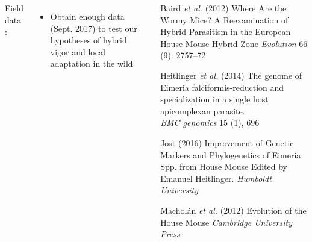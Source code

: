 \documentclass[30pt, a0paper, portrait, margin=0mm, innermargin=15mm,
               blockverticalspace=15mm, colspace=15mm, subcolspace=8mm]{tikzposter}
\begin{document}
\begin{columns}
{ %
 Field data :
    \begin{itemize}
        \item Obtain enough data (Sept. 2017) to test our hypotheses of hybrid vigor and local adaptation in the wild
  \end{itemize}

 
}


      {
        \begin{small}
          
          \hangindent=2cm Baird \textit{et al.} (2012) Where Are the Wormy Mice? A Reexamination of Hybrid Parasitism in the European House Mouse Hybrid Zone
           \textit{Evolution} 66 (9): 2757--72
           
          \hangindent=2cm Heitlinger \textit{et al.} (2014) The genome of Eimeria falciformis-reduction and specialization in a single host apicomplexan              parasite.\\ \textit{BMC genomics} 15 (1), 696

          \hangindent=2cm Jost (2016) Improvement of Genetic Markers and Phylogenetics of Eimeria Spp. from House Mouse
          Edited by Emanuel Heitlinger. \textit{Humboldt University}

          \hangindent=2cm Machol\'{a}n \textit{et al.} (2012) Evolution of the House Mouse
          \textit{Cambridge University Press}
          
        
          
        \end{small}
      }

\end{columns}

\end{document}
